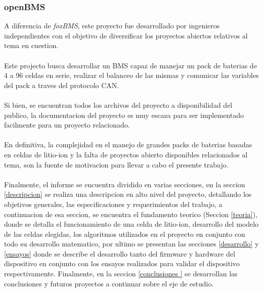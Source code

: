 \documentclass[10pt,a4paper]{article}
\begin{document}
    \clearpage

    \subsubsection{openBMS}

    \noindent A diferencia de \emph{foxBMS}, este proyecto fue desarrollado por 
    ingenieros independientes con el objetivo de diversificar los proyectos 
    abiertos relativos al tema en cuestion.\\
    \\
    \noindent Este projecto busca desarrollar un BMS capaz de manejar un pack 
    de baterias de 4 a 96 celdas en serie, realizar el balanceo de las mismas y 
    comunicar las variables del pack a traves del protocolo CAN.\\
    \\
    \noindent Si bien, se encuentran todos los archivos del proyecto a 
    disponibilidad del publico, la documentacion del proyecto es muy escaza 
    para ser implementado facilmente para un proyecto relacionado.\\
    \\
    \noindent En definitiva, la complejidad en el manejo de grandes packs de 
    baterias basadas en celdas de litio-ion y la falta de proyectos abierto 
    disponibles relacionados al tema, son la fuente de motivacion para 
    llevar a cabo el presente trabajo.\\
    \\
    \noindent Finalmente, el informe se encuentra dividido en varias secciones, en la
    seccion \ref{descripcion} se realiza una descripcion en alto nivel del
    proyecto, detallando los objetivos generales, las especificaciones y
    requerimientos del trabajo, a continuacion de esa seccion, se encuentra el
    fundamento teorico (Seccion \ref{teoria}), donde se detalla el funcionamiento de una celda de
    litio-ion, desarrollo del modelo de las celdas elegidas, los algoritmos 
    utilizados en el proyecto en conjunto con todo su desarrollo matematico, por
    ultimo se presentan las secciones \ref{desarrollo} y \ref{ensayos} donde se
    describe el desarrollo tanto del firmware y hardware del dispositivo en
    conjunto con los ensayos realizados para validar el dispositivo
    respectivamente. Finalmente, en la seccion \ref{conclusiones }
    se desarrollan las conclusiones y futuros proyectos a continuar sobre el 
    eje de estudio.
	
	\clearpage
	
\end{document}
